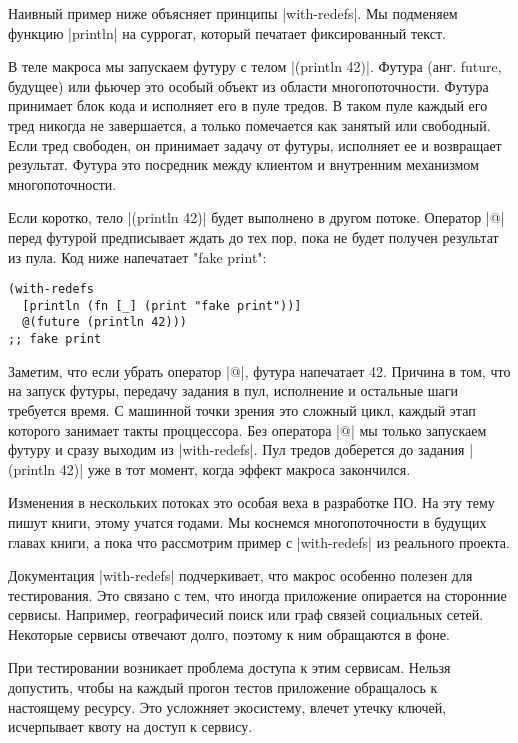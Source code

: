 {{{{{{{{Наивный пример ниже объясняет принципы \spverb|with-redefs|. Мы подменяем функцию
\spverb|println| на суррогат, который печатает фиксированный текст.

В теле макроса мы запускаем футуру с телом \spverb|(println 42)|. Футура (анг. future,
будущее) или фьючер это особый объект из области многопоточности. Футура
принимает блок кода и исполняет его в пуле тредов. В таком пуле каждый его тред
никогда не завершается, а только помечается как занятый или свободный. Если тред
свободен, он принимает задачу от футуры, исполняет ее и возвращает
результат. Футура это посредник между клиентом и внутренним механизмом
многопоточности.

Если коротко, тело \spverb|(println 42)| будет выполнено в другом потоке. Оператор \spverb|@|
перед футурой предписывает ждать до тех пор, пока не будет получен результат из
пула. Код ниже напечатает "fake print":

\begin{verbatim}
(with-redefs
  [println (fn [_] (print "fake print"))]
  @(future (println 42)))
;; fake print
\end{verbatim}

Заметим, что если убрать оператор \spverb|@|, футура напечатает 42. Причина в том, что
на запуск футуры, передачу задания в пул, исполнение и остальные шаги требуется
время. С машинной точки зрения это сложный цикл, каждый этап которого занимает
такты проццессора. Без оператора \spverb|@| мы только запускаем футуру и сразу выходим
из \spverb|with-redefs|. Пул тредов доберется до задания \spverb|(println 42)| уже в тот
момент, когда эффект макроса закончился.

Изменения в нескольких потоках это особая веха в разработке ПО. На эту тему
пишут книги, этому учатся годами. Мы коснемся многопоточности в будущих главах
книги, а пока что рассмотрим пример с \spverb|with-redefs| из реального проекта.

Документация \spverb|with-redefs| подчеркивает, что макрос особенно полезен для
тестирования. Это связано с тем, что иногда приложение опирается на сторонние
сервисы. Например, географичесий поиск или граф связей социальных
сетей. Некоторые сервисы отвечают долго, поэтому к ним обращаются в фоне.

При тестировании возникает проблема доступа к этим сервисам. Нельзя допустить,
чтобы на каждый прогон тестов приложение обращалось к настоящему ресурсу. Это
усложняет экосистему, влечет утечку ключей, исчерпывает квоту на доступ к
сервису.

}}}}}}}}

